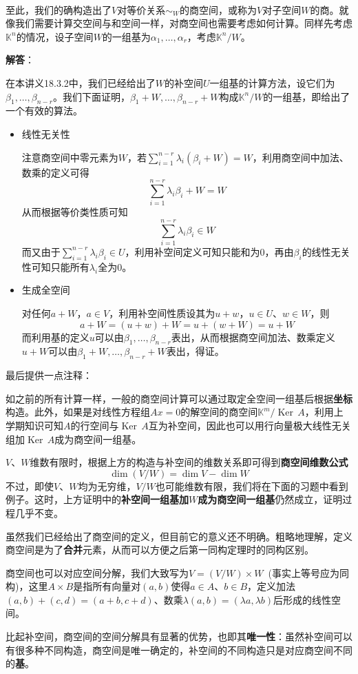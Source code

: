 \documentclass[a4paper,UTF8,fontset=windows,AutoFakeBold]{ctexart}
\DeclareMathOperator{\Ker}{Ker\,}
\newcommand{\sol}[1]{{\vspace{5pt}\kaishu\noindent\textbf{解答}：\vspace{-3pt}
\begin{compactitem}
    \item[] #1
\end{compactitem}
}}
\begin{document}
\

至此，我们的确构造出了$V$对等价关系$\sim_W$的商空间，或称为$V$对子空间$W$的商。就像我们需要计算交空间与和空间一样，对商空间也需要考虑如何计算。同样先考虑$\mathbb{K}^n$的情况，设子空间$W$的一组基为$\alpha_1,\dots,\alpha_r$，考虑$\mathbb{K}^n/W$。

\sol{
    在本讲义18.3.2中，我们已经给出了$W$的补空间$U$一组基的计算方法，设它们为$\beta_1,\dots,\beta_{n-r}$。我们下面证明，$\beta_1+W,\dots,\beta_{n-r}+W$构成$\mathbb{K}^n/W$的一组基，即给出了一个有效的算法。

    \begin{itemize}
        \item 线性无关性
        
        注意商空间中零元素为$W$，若$\sum_{i=1}^{n-r}\lambda_i(\beta_i+W)=W$，利用商空间中加法、数乘的定义可得
        $$\sum_{i=1}^{n-r}\lambda_i\beta_i+W=W$$
        从而根据等价类性质可知
        $$\sum_{i=1}^{n-r}\lambda_i\beta_i\in W$$
        而又由于$\sum_{i=1}^{n-r}\lambda_i\beta_i\in U$，利用补空间定义可知只能和为0，再由$\beta_i$的线性无关性可知只能所有$\lambda_i$全为0。

        \item 生成全空间
        
        对任何$a+W$，$a\in V$，利用补空间性质设其为$u+w$，$u\in U$、$w\in W$，则
        $$a+W=(u+w)+W=u+(w+W)=u+W$$
        而利用基的定义$u$可以由$\beta_1,\dots,\beta_{n-r}$表出，从而根据商空间加法、数乘定义$u+W$可以由$\beta_1+W,\dots,\beta_{n-r}+W$表出，得证。
    \end{itemize}
}

最后提供一点注释：
\begin{compactitem}
    \item 如之前的所有计算一样，一般的商空间计算可以通过取定全空间一组基后根据\textbf{坐标}构造。此外，如果是对线性方程组$Ax=0$的解空间的商空间$\mathbb{K}^m/\Ker A$，利用上学期知识可知$A$的行空间与$\Ker A$互为补空间，因此也可以用行向量极大线性无关组加$\Ker A$成为商空间一组基。
    \item $V$、$W$维数有限时，根据上方的构造与补空间的维数关系即可得到\textbf{商空间维数公式}
    $$\dim(V/W)=\dim V-\dim W$$
    不过，即使$V$、$W$均为无穷维，$V/W$也可能维数有限，我们将在下面的习题中看到例子。这时，上方证明中的\textbf{补空间一组基加$W$成为商空间一组基}仍然成立，证明过程几乎不变。
    \item 虽然我们已经给出了商空间的定义，但目前它的意义还不明确。粗略地理解，定义商空间是为了\textbf{合并}元素，从而可以方便之后第一同构定理时的同构区别。
    \item 商空间也可以对应空间分解，我们大致写为$V=(V/W)\times W$\ (事实上等号应为同构)，这里$A\times B$是指所有向量对$(a,b)$使得$a\in A$、$b\in B$，定义加法$(a,b)+(c,d)=(a+b,c+d)$、数乘$\lambda(a,b)=(\lambda a,\lambda b)$后形成的线性空间。
    \item 比起补空间，商空间的空间分解具有显著的优势，也即其\textbf{唯一性}：虽然补空间可以有很多种不同构造，商空间是唯一确定的，补空间的不同构造只是对应商空间不同的\textbf{基}。
\end{compactitem}
\end{document}

